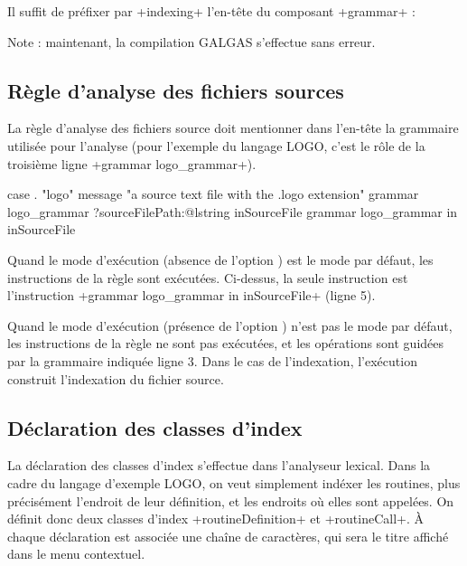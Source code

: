 Il suffit de préfixer par \ggs+indexing+ l'en-tête du composant \ggs+grammar+ :

\begin{galgas}
indexing grammar logo_grammar ... {
  ...
\end{galgas}

Note : maintenant, la compilation GALGAS s'effectue sans erreur.




\subsection{Règle d'analyse des fichiers sources}

La règle d'analyse des fichiers source doit mentionner dans l'en-tête la grammaire utilisée pour l'analyse (pour l'exemple du langage LOGO, c'est le rôle de la troisième ligne \ggs+grammar logo_grammar+).

\begin{galgas}
case . "logo"
message "a source text file with the .logo extension"
grammar logo_grammar
?sourceFilePath:@lstring inSourceFile {
  grammar logo_grammar in inSourceFile
}
\end{galgas}

Quand le mode d'exécution (absence de l'option ) est le mode par défaut, les instructions de la règle sont exécutées. Ci-dessus, la seule instruction est l'instruction \ggs+grammar logo_grammar in inSourceFile+ (ligne 5).

Quand le mode d'exécution (présence de l'option ) n'est pas le mode par défaut, les instructions de la règle ne sont pas exécutées, et les opérations sont guidées par la grammaire indiquée ligne 3. Dans le cas de l'indexation, l'exécution construit l'indexation du fichier source.









\subsection{Déclaration des classes d'index}

La déclaration des classes d'index s'effectue dans l'analyseur lexical. Dans la cadre du langage d'exemple LOGO, on veut simplement indéxer les routines, plus précisément l'endroit de leur définition, et les endroits où elles sont appelées. On définit donc deux classes d'index \ggs+routineDefinition+ et \ggs+routineCall+. À chaque déclaration est associée une chaîne de caractères, qui sera le titre affiché dans le menu contextuel. 


